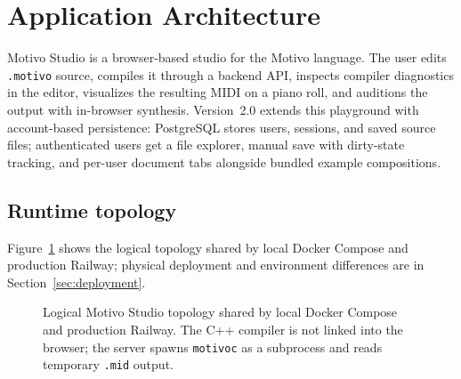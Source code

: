 \section{Application Architecture}\label{sec:studio-architecture}

Motivo Studio is a browser-based studio for the Motivo language.
The user edits \texttt{.motivo} source, compiles it through a backend API, inspects compiler diagnostics in the
editor, visualizes the resulting MIDI on a piano roll, and auditions the output with in-browser synthesis.
Version~2.0 extends this playground with account-based persistence: PostgreSQL stores users, sessions, and saved
source files; authenticated users get a file explorer, manual save with dirty-state tracking, and per-user document
tabs alongside bundled example compositions.

\subsection{Runtime topology}\label{subsec:studio-runtime-topology}

Figure~\ref{fig:studio-architecture} shows the logical topology shared by local Docker Compose and production Railway;
physical deployment and environment differences are in Section~\ref{sec:deployment}.

\begin{figure}[htbp]
  \centering
  \caption{Logical Motivo Studio topology shared by local Docker Compose and production Railway.
    The C++ compiler is not linked into the browser; the server spawns \texttt{motivoc} as a subprocess and reads
  temporary \texttt{.mid} output.}\label{fig:studio-architecture}
\end{figure}

